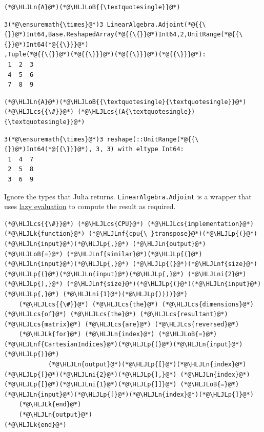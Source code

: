 \documentclass[12pt,a4paper]{article}
\newcommand{\HLJLk}[1]{\textcolor[RGB]{148,91,176}{\textbf{#1}}}
\newcommand{\HLJLn}[1]{#1}
\newcommand{\HLJLnf}[1]{\textcolor[RGB]{66,102,213}{#1}}
\newcommand{\HLJLni}[1]{\textcolor[RGB]{59,151,46}{#1}}
\newcommand{\HLJLoB}[1]{\textcolor[RGB]{102,102,102}{\textbf{#1}}}
\newcommand{\HLJLp}[1]{#1}
\newcommand{\HLJLcs}[1]{\textcolor[RGB]{153,153,119}{\textit{#1}}}
\begin{document}
\begin{lstlisting}
(*@\HLJLn{A}@*)(*@\HLJLoB{{\textquotesingle}}@*)
\end{lstlisting}

\begin{lstlisting}
3(*@\ensuremath{\times}@*)3 LinearAlgebra.Adjoint(*@{{\{}}@*)Int64,Base.ReshapedArray(*@{{\{}}@*)Int64,2,UnitRange(*@{{\{}}@*)Int64(*@{{\}}}@*)
,Tuple(*@{{\{}}@*)(*@{{\}}}@*)(*@{{\}}}@*)(*@{{\}}}@*):
 1  2  3
 4  5  6
 7  8  9
\end{lstlisting}


\begin{lstlisting}
(*@\HLJLn{A}@*)(*@\HLJLoB{{\textquotesingle}{\textquotesingle}}@*) (*@\HLJLcs{{\#}}@*) (*@\HLJLcs{(A{\textquotesingle}){\textquotesingle}}@*)
\end{lstlisting}

\begin{lstlisting}
3(*@\ensuremath{\times}@*)3 reshape(::UnitRange(*@{{\{}}@*)Int64(*@{{\}}}@*), 3, 3) with eltype Int64:
 1  4  7
 2  5  8
 3  6  9
\end{lstlisting}


Ignore the types that Julia returns. \texttt{LinearAlgebra.Adjoint} is a wrapper that uses \href{https://en.wikipedia.org/wiki/Lazy_evaluation}{lazy evaluation} to compute the result as required.


\begin{lstlisting}
(*@\HLJLcs{{\#}}@*) (*@\HLJLcs{CPU}@*) (*@\HLJLcs{implementation}@*)
(*@\HLJLk{function}@*) (*@\HLJLnf{cpu{\_}transpose}@*)(*@\HLJLp{(}@*)(*@\HLJLn{input}@*)(*@\HLJLp{,}@*) (*@\HLJLn{output}@*) (*@\HLJLoB{=}@*) (*@\HLJLnf{similar}@*)(*@\HLJLp{(}@*)(*@\HLJLn{input}@*)(*@\HLJLp{,}@*) (*@\HLJLp{(}@*)(*@\HLJLnf{size}@*)(*@\HLJLp{(}@*)(*@\HLJLn{input}@*)(*@\HLJLp{,}@*) (*@\HLJLni{2}@*)(*@\HLJLp{),}@*) (*@\HLJLnf{size}@*)(*@\HLJLp{(}@*)(*@\HLJLn{input}@*)(*@\HLJLp{,}@*) (*@\HLJLni{1}@*)(*@\HLJLp{))))}@*)
    (*@\HLJLcs{{\#}}@*) (*@\HLJLcs{the}@*) (*@\HLJLcs{dimensions}@*) (*@\HLJLcs{of}@*) (*@\HLJLcs{the}@*) (*@\HLJLcs{resultant}@*) (*@\HLJLcs{matrix}@*) (*@\HLJLcs{are}@*) (*@\HLJLcs{reversed}@*)
    (*@\HLJLk{for}@*) (*@\HLJLn{index}@*) (*@\HLJLoB{=}@*) (*@\HLJLnf{CartesianIndices}@*)(*@\HLJLp{(}@*)(*@\HLJLn{input}@*)(*@\HLJLp{)}@*)
            (*@\HLJLn{output}@*)(*@\HLJLp{[}@*)(*@\HLJLn{index}@*)(*@\HLJLp{[}@*)(*@\HLJLni{2}@*)(*@\HLJLp{],}@*) (*@\HLJLn{index}@*)(*@\HLJLp{[}@*)(*@\HLJLni{1}@*)(*@\HLJLp{]]}@*) (*@\HLJLoB{=}@*) (*@\HLJLn{input}@*)(*@\HLJLp{[}@*)(*@\HLJLn{index}@*)(*@\HLJLp{]}@*)
    (*@\HLJLk{end}@*)
    (*@\HLJLn{output}@*)
(*@\HLJLk{end}@*)
\end{lstlisting}
\end{document}
